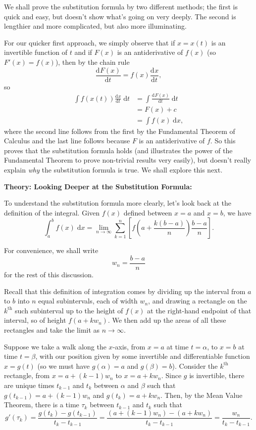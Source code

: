 \documentclass{article}
\newcommand{\deriv}[3][]{\frac{\mathrm{d}^{#1}#2}{\mathrm{d}#3^{#1}}}
\newcommand{\diff}{\;\mathrm{d}}
\begin{document}
We shall prove the substitution formula by two different methods; the first is quick and easy, but doesn't show what's going on very deeply. The second is lengthier and more complicated, but also more illuminating.

For our quicker first approach, we simply observe that if $x=x(t)$ is an invertible function of $t$ and if $F(x)$ is an antiderivative of $f(x)$ (so $F'(x)=f(x)$), then by the chain rule
\[\deriv{F(x)}{t}=f(x)\deriv{x}{t},\]
so
\begin{align*}
	\int f(x(t))\deriv{x}{t}\diff t &=\int \deriv{F(x)}{t}\diff t\\
	&= F(x)+c\\
	&= \int f(x)\diff x,
\end{align*}
where the second line follows from the first by the Fundamental Theorem of Calculus and the last line follows because $F$ is an antiderivative of $f$. So this proves that the substitution formula holds (and illustrates the power of the Fundamental Theorem to prove non-trivial results very easily), but doesn't really explain \textit{why} the substitution formula is true. We shall explore this next.










\clearpage





\textbf{Theory: Looking Deeper at the Substitution Formula:}\bigskip




To understand the substitution formula more clearly, let's look back at the definition of the integral. Given $f(x)$ defined between $x=a$ and $x=b$, we have
\[\int_a^b f(x)\diff x = \lim_{n\to\infty}\sum_{k=1}^n \left[f\left(a+\frac{k(b-a)}{n}\right)\frac{b-a}{n}\right].\]

For convenience, we shall write
\[w_n = \frac{b-a}{n}\]
for the rest of this discussion.

Recall that this definition of integration comes by dividing up the interval from $a$ to $b$ into $n$ equal subintervals, each of width $w_n$, and drawing a rectangle on the $k^\mathrm{th}$ such subinterval up to the height of $f(x)$ at the right-hand endpoint of that interval, so of height $f\left(a+k w_n\right)$. We then add up the areas of all these rectangles and take the limit as $n\to\infty$.

Suppose we take a walk along the $x$-axis, from $x=a$ at time $t=\alpha$, to $x=b$ at time $t=\beta$, with our position given by some invertible and differentiable function $x=g(t)$ (so we must have $g(\alpha)=a$ and $g(\beta)=b$). Consider the $k^\mathrm{th}$ rectangle, from $x=a+(k-1)w_n$ to $x=a+kw_n$. Since $g$ is invertible, there are unique times $t_{k-1}$ and $t_k$ between $\alpha$ and $\beta$ such that $g(t_{k-1})=a+(k-1)w_n$ and $g(t_k)=a+kw_n$. Then, by the Mean Value Theorem, there is a time $\tau_k$ between $t_{k-1}$ and $t_k$ such that
\[g'(\tau_k)=\frac{g(t_k)-g(t_{k-1})}{t_k-t_{k-1}}=\frac{(a+(k-1)w_n)-(a+kw_n)}{t_k-t_{k-1}}=\frac{w_n}{t_k-t_{k-1}}.\]
\end{document}
